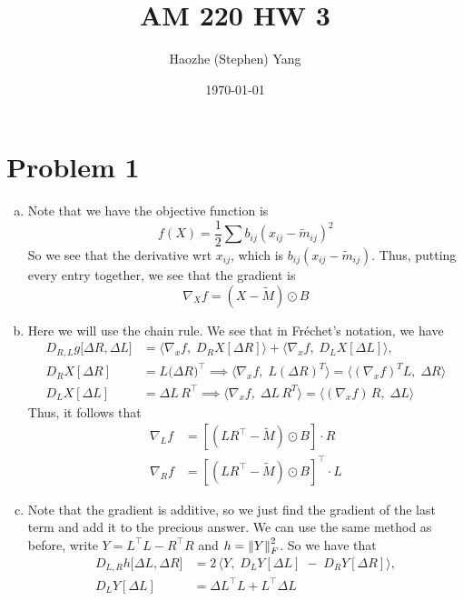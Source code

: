 \documentclass[11pt]{scrartcl}
\begin{document}
\title{AM 220 HW 3}
\author{Haozhe (Stephen) Yang}
\date{\today}
\maketitle

\section{Problem 1}

\begin{enumerate}[(a)]
    \item Note that we have the objective function is \[f(X) = \frac 12 \sum b_{ij} (x_{ij} - \tilde m_{ij})^2\]
    So we see that the derivative wrt $x_{ij}$, which is $b_{ij}(x_{ij} - \tilde m_{ij})$. Thus, putting every entry together, we see that the gradient is \[\nabla_X f = (X - \tilde M) \odot B\]
    \item Here we will use the chain rule. We see that in Fréchet's notation, we have \begin{align*}
    D_{R,L}g\bigl[\Delta R,\Delta L\bigr]
    &=\bigl\langle\nabla_x f,\;D_R X[\Delta R]\bigr\rangle
    +\bigl\langle\nabla_x f,\;D_L X[\Delta L]\bigr\rangle,\\
    D_R X[\Delta R]&=L\bigl(\Delta R\bigr)^{\top} \implies \bigl\langle\nabla_x f,\;L(\Delta R)^{T}\bigr\rangle
    =\bigl\langle(\nabla_x f)^{T}L,\;\Delta R\bigr\rangle \\
    D_L X[\Delta L]&=\Delta L\,R^{\top} \implies \bigl\langle\nabla_x f,\;\Delta L\,R^{T}\bigr\rangle
    =\bigl\langle(\nabla_x f)\,R,\;\Delta L\bigr\rangle
    \end{align*}
    Thus, it follows that \begin{align*}
        \nabla_L f &= \left[(LR^\top-\tilde M)\odot B \right] \cdot R \\
        \nabla_R f &= \left[(LR^\top - \tilde M) \odot B\right]^\top \cdot L
    \end{align*}
    \item Note that the gradient is additive, so we just find the gradient of the last term and add it to the precious answer. We can use the same method as before, write $Y = L^\top L - R^\top R$ and $h = \left\lVert Y \right\rVert_F^2$. So we have that \begin{align*}
    D_{L,R}h\bigl[\Delta L,\Delta R\bigr]
    &=2\,\bigl\langle Y,\;D_{L}Y[\Delta L]\;-\;D_{R}Y[\Delta R]\bigr\rangle,\\
    D_{L}Y[\Delta L]
    &=\Delta L^{\top}L + L^{\top}\Delta L \\ 

\end{align*}
\end{enumerate}
\end{document}
